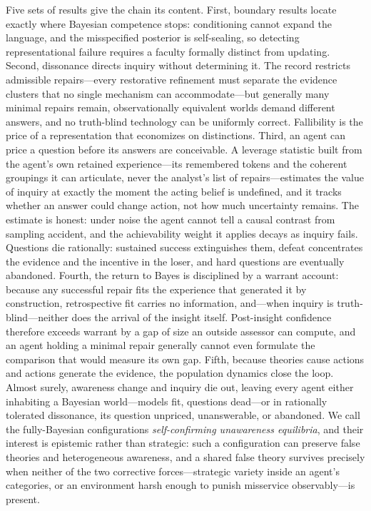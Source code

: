 \documentclass[11pt]{article}
\theoremstyle{definition}
\begin{document}
Five sets of results give the chain its content.
First, boundary results locate exactly where Bayesian competence stops: conditioning cannot expand the language, and the misspecified posterior is self-sealing, so detecting representational failure requires a faculty formally distinct from updating.
Second, dissonance directs inquiry without determining it.
The record restricts admissible repairs---every restorative refinement must separate the evidence clusters that no single mechanism can accommodate---but generally many minimal repairs remain, observationally equivalent worlds demand different answers, and no truth-blind technology can be uniformly correct.
Fallibility is the price of a representation that economizes on distinctions.
Third, an agent can price a question before its answers are conceivable.
A leverage statistic built from the agent's own retained experience---its remembered tokens and the coherent groupings it can articulate, never the analyst's list of repairs---estimates the value of inquiry at exactly the moment the acting belief is undefined, and it tracks whether an answer could change action, not how much uncertainty remains.
The estimate is honest: under noise the agent cannot tell a causal contrast from sampling accident, and the achievability weight it applies decays as inquiry fails.
Questions die rationally: sustained success extinguishes them, defeat concentrates the evidence and the incentive in the loser, and hard questions are eventually abandoned.
Fourth, the return to Bayes is disciplined by a warrant account: because any successful repair fits the experience that generated it by construction, retrospective fit carries no information, and---when inquiry is truth-blind---neither does the arrival of the insight itself.
Post-insight confidence therefore exceeds warrant by a gap of size an outside assessor can compute, and an agent holding a minimal repair generally cannot even formulate the comparison that would measure its own gap.
Fifth, because theories cause actions and actions generate the evidence, the population dynamics close the loop.
Almost surely, awareness change and inquiry die out, leaving every agent either inhabiting a Bayesian world---models fit, questions dead---or in rationally tolerated dissonance, its question unpriced, unanswerable, or abandoned.
We call the fully-Bayesian configurations \emph{self-confirming unawareness equilibria}, and their interest is epistemic rather than strategic: such a configuration can preserve false theories and heterogeneous awareness, and a shared false theory survives precisely when neither of the two corrective forces---strategic variety inside an agent's categories, or an environment harsh enough to punish misservice observably---is present.
\end{document}
